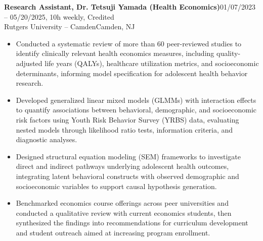 \documentclass[11pt]{article}
\newcommand{\workentry}[4]{%
  \Needspace{7\baselineskip}%
  \textbf{#1}\hfill #2\\[-1pt]%
  #3\hfill #4\\[-8pt]%
}
\newenvironment{tightitemize}{%
  \vspace{-2pt}%
  \begin{itemize}[leftmargin=*,topsep=0pt,itemsep=1pt,parsep=0pt,partopsep=0pt]
}{%
  \end{itemize}\vspace{4pt}
}
\begin{document}
\workentry
{Research Assistant, Dr. Tetsuji Yamada (Health Economics)}
{01/07/2023 -- 05/20/2025, 10h weekly, Credited}
{Rutgers University -- Camden}
{Camden, NJ}
\begin{tightitemize}
\item Conducted a systematic review of more than 60 peer-reviewed studies to identify clinically relevant health economics measures, including quality-adjusted life years (QALYs), healthcare utilization metrics, and socioeconomic determinants, informing model specification for adolescent health behavior research.
\item Developed generalized linear mixed models (GLMMs) with interaction effects to quantify associations between behavioral, demographic, and socioeconomic risk factors using Youth Risk Behavior Survey (YRBS) data, evaluating nested models through likelihood ratio tests, information criteria, and diagnostic analyses.
\item Designed structural equation modeling (SEM) frameworks to investigate direct and indirect pathways underlying adolescent health outcomes, integrating latent behavioral constructs with observed demographic and socioeconomic variables to support causal hypothesis generation.
\item Benchmarked economics course offerings across peer universities and conducted a qualitative review with current economics students, then synthesized the findings into recommendations for curriculum development and student outreach aimed at increasing program enrollment.
\end{tightitemize}
\end{document}
